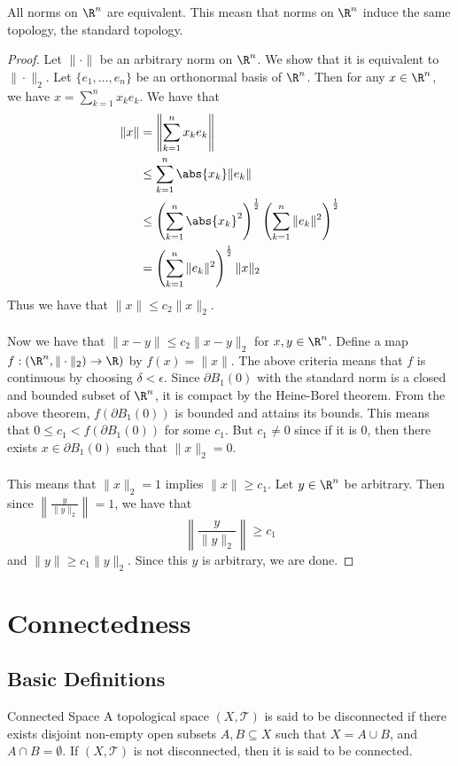 \begin{thm}{}{} All norms on $\R^n$ are equivalent. This measn that norms on $\R^n$ induce the same topology, the standard topology. \tcbline
\begin{proof}
Let $\|\cdot\|$ be an arbitrary norm on $\R^n$. We show that it is equivalent to $\|\cdot\|_2$. Let $\{e_1,\dots,e_n\}$ be an orthonormal basis of $\R^n$. Then for any $x\in\R^n$, we have $x=\sum_{k=1}^nx_ke_k$. We have that 
\begin{align*}
\|x\|&=\left\|\sum_{k=1}^nx_ke_k\right\|\\
&\leq\sum_{k=1}^n\abs{x_k}\|e_k\|\\
&\leq\left(\sum_{k=1}^n\abs{x_k}^2\right)^{\frac{1}{2}}\left(\sum_{k=1}^n\|e_k\|^2\right)^{\frac{1}{2}}\\
&=\left(\sum_{k=1}^n\|e_k\|^2\right)^{\frac{1}{2}}\|x\|_2
\end{align*}
Thus we have that $\|x\|\leq c_2\|x\|_2$. \\~\\
Now we have that $\|x-y\|\leq c_2\|x-y\|_2$ for $x,y\in\R^n$. Define a map $f:(\R^n,\|\cdot\|_2)\to\R)$ by $f(x)=\|x\|$. The above criteria means that $f$ is continuous by choosing $\delta<\epsilon$. Since $\partial B_1(0)$ with the standard norm is a closed and bounded subset of $\R^n$, it is compact by the Heine-Borel theorem. From the above theorem, $f(\partial B_1(0))$ is bounded and attains its bounds. This means that $0\leq c_1<f(\partial B_1(0))$ for some $c_1$. But $c_1\neq 0$ since if it is $0$, then there exists $x\in\partial B_1(0)$ such that $\|x\|_2=0$. \\~\\
This means that $\|x\|_2=1$ implies $\|x\|\geq c_1$. Let $y\in\R^n$ be arbitrary. Then since $\left\|\frac{y}{\|y\|_2}\right\|=1$, we have that $$\left\|\frac{y}{\|y\|_2}\right\|\geq c_1$$ and $\|y\|\geq c_1\|y\|_2$. Since this $y$ is arbitrary, we are done. 
\end{proof}
\end{thm}

\pagebreak
\section{Connectedness}
\subsection{Basic Definitions}
\begin{defn}{Connected Space}{} A topological space $(X,\mathcal{T})$ is said to be disconnected if there exists disjoint non-empty open subsets $A,B\subseteq X$ such that $X=A\cup B$, and $A\cap B=\emptyset$. If $(X,\mathcal{T})$ is not disconnected, then it is said to be connected. 
\end{defn}

